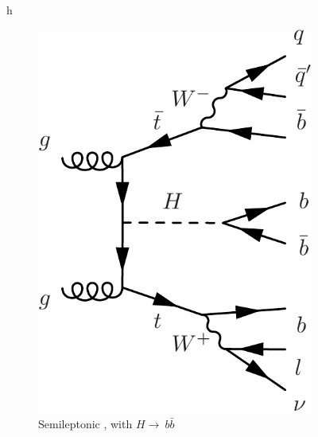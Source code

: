 \begin{figure}{h}
    \centering
    \begin{subfigure}[h]{0.4\textwidth}
        \includegraphics[width=\textwidth]{Figures/Feynman_Diagrams/higgs_production__tth_semileptonic.pdf}
        \caption{Semileptonic \ttH, with $H\rightarrow~b\bar{b}$}\label{fig:higgs_production_tth_semileptonic}
      \end{subfigure}
      ~ %
      \begin{subfigure}[h]{0.4\textwidth}

\end{subfigure}
\end{figure}
